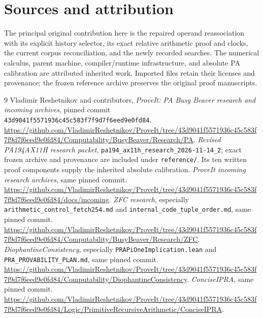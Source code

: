 \documentclass[11pt,a4paper]{article}
\theoremstyle{definition}
\newcommand{\file}[1]{\nolinkurl{#1}}
\begin{document}
\clearpage
\section{Sources and attribution}
The principal original contribution here is the repaired operand
reassociation with its explicit history selector, its exact relative
arithmetic proof and clocks, the current corpus reconciliation, and
the newly recorded searches. The numerical calculus, parent machine,
compiler/runtime infrastructure, and absolute PA calibration are
attributed inherited work. Imported files retain their licenses and
provenance; the frozen reference archive preserves the original proof
manuscripts.

\begin{thebibliography}{9}
 Vladimir Reshetnikov and contributors, \emph{ProveIt:
PA Busy Beaver research and incoming archives}, pinned commit
\nolinkurl{43d9041f5571936c45c583f7f9d7f6eed9e0fd84}.
\url{https://github.com/VladimirReshetnikov/ProveIt/tree/43d9041f5571936c45c583f7f9d7f6eed9e0fd84/Computability/BusyBeaver/Research/PA}.
 \emph{Revised PA194AX11H research packet},
\file{pa194_ax11h_research_2026-11-14_2}; exact frozen archive and
provenance are included under \file{reference/}. Its ten written
proof components supply the inherited absolute calibration.
 \emph{ProveIt incoming research archives},
same pinned commit.
\url{https://github.com/VladimirReshetnikov/ProveIt/tree/43d9041f5571936c45c583f7f9d7f6eed9e0fd84/docs/incoming}.
 \emph{ZFC research}, especially
\file{arithmetic_control_fetch254.md} and
\file{internal_code_tuple_order.md}, same pinned commit.
\url{https://github.com/VladimirReshetnikov/ProveIt/tree/43d9041f5571936c45c583f7f9d7f6eed9e0fd84/Computability/BusyBeaver/Research/ZFC}.
 \emph{DiophantineConsistency}, especially
\file{PRAPiOneImplication.lean} and \file{PRA_PROVABILITY_PLAN.md},
same pinned commit.
\url{https://github.com/VladimirReshetnikov/ProveIt/tree/43d9041f5571936c45c583f7f9d7f6eed9e0fd84/Computability/DiophantineConsistency}.
 \emph{ConciseIPRA}, same pinned commit.
\url{https://github.com/VladimirReshetnikov/ProveIt/tree/43d9041f5571936c45c583f7f9d7f6eed9e0fd84/Logic/PrimitiveRecursiveArithmetic/ConciseIPRA}.
\end{thebibliography}
\end{document}
